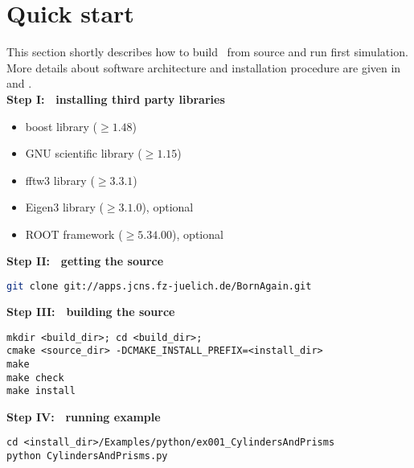 \newpage
\section{Quick start} 

This section shortly describes how to build \BornAgain\ from source and run first
simulation. More details about software architecture and installation
procedure are given in  and . \\

\noindent
{\bf Step I: $~$ installing third party libraries}
\begin{itemize}
\item boost library ($\geq 1.48$)
\item GNU scientific library ($\geq 1.15$)
\item fftw3 library ($\geq 3.3.1$)
\item Eigen3 library ($\geq 3.1.0$), optional
\item ROOT framework ($\geq 5.34.00$), optional
\end{itemize}
\vspace*{2mm}


\noindent
{\bf Step II: $~$ getting the source}
\begin{lstlisting}[language=bash, style=commandline]
git clone git://apps.jcns.fz-juelich.de/BornAgain.git 
\end{lstlisting}
\vspace*{3mm}


\noindent
{\bf Step III: $~$ building the source}
\begin{lstlisting}[language=shell, style=commandline]
mkdir <build_dir>; cd <build_dir>;
cmake <source_dir> -DCMAKE_INSTALL_PREFIX=<install_dir>
make
make check
make install
\end{lstlisting}
\vspace*{3mm}


\noindent
{\bf Step IV: $~$ running example}
\begin{lstlisting}[language=shell, style=commandline]
cd <install_dir>/Examples/python/ex001_CylindersAndPrisms
python CylindersAndPrisms.py
\end{lstlisting}




